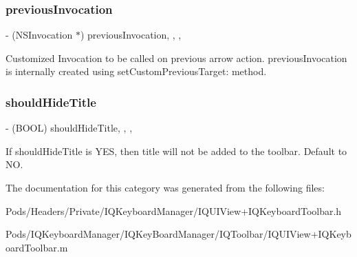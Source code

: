 \subsubsection{\texorpdfstring{previous\+Invocation}{previousInvocation}}
{\footnotesize\ttfamily -\/ (N\+S\+Invocation $\ast$) previous\+Invocation\hspace{0.3cm}{\ttfamily [read]}, {\ttfamily [write]}, {\ttfamily [nonatomic]}, {\ttfamily [strong]}}

Customized Invocation to be called on previous arrow action. previous\+Invocation is internally created using set\+Custom\+Previous\+Target\+: method. \mbox{\label{category_u_i_view_07_i_q_toolbar_addition_08_a855865f7d2ace4051225f4c0d86a74a3}} 
\subsubsection{\texorpdfstring{should\+Hide\+Title}{shouldHideTitle}}
{\footnotesize\ttfamily -\/ (B\+O\+OL) should\+Hide\+Title\hspace{0.3cm}{\ttfamily [read]}, {\ttfamily [write]}, {\ttfamily [nonatomic]}, {\ttfamily [assign]}}

If should\+Hide\+Title is Y\+ES, then title will not be added to the toolbar. Default to NO. 

The documentation for this category was generated from the following files\+:\begin{DoxyCompactItemize}
\item 
Pods/\+Headers/\+Private/\+I\+Q\+Keyboard\+Manager/I\+Q\+U\+I\+View+\+I\+Q\+Keyboard\+Toolbar.\+h\item 
Pods/\+I\+Q\+Keyboard\+Manager/\+I\+Q\+Key\+Board\+Manager/\+I\+Q\+Toolbar/I\+Q\+U\+I\+View+\+I\+Q\+Keyboard\+Toolbar.\+m\end{DoxyCompactItemize}
